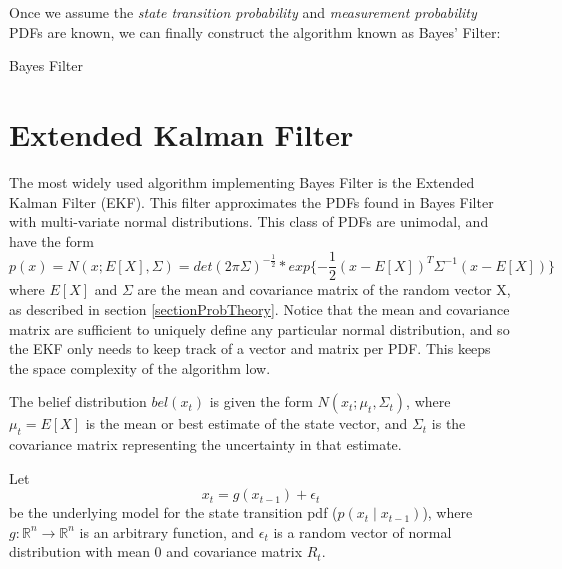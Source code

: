 Once we assume the \textit{state transition probability} and \textit{measurement probability} PDFs are known, we can finally construct the algorithm known as Bayes' Filter:

\begin{algorithm} 
\caption{Bayes Filter} 
\label{alg:BayesFilter}
\begin{algorithmic}[1]
	\State {}
	\EndFunction
\end{algorithmic}
\end{algorithm}

\section{Extended Kalman Filter} \label{sectionEKF}

The most widely used algorithm implementing Bayes Filter is the Extended Kalman Filter (EKF). This filter approximates the PDFs found in Bayes Filter with multi-variate normal distributions. This class of PDFs are unimodal, and have the form 
\begin{equation} \label{eqDefNormal}
p(x) = N(x; E[X],\Sigma) = det(2 \pi \Sigma)^{-\frac{1}{2}} * exp \{-\frac{1}{2} (x - E[X])^T \Sigma^{-1} (x - E[X])\}
\end{equation}
where \(E[X]\) and \(\Sigma\) are the mean and covariance matrix of the random vector X, as described in section \ref{sectionProbTheory}. Notice that the mean and covariance matrix are sufficient to uniquely define any particular normal  distribution, and so the EKF only needs to keep track of a vector and matrix per PDF. This keeps the space complexity of the algorithm low.

The belief distribution \(bel(x_t)\) is given the form \(N(x_t; \mu_t,\Sigma_t)\), where \(\mu_t = E[X]\) is the mean or best estimate of the state vector, and \(\Sigma_t\) is the covariance matrix representing the uncertainty in that estimate.

Let \[x_t =  g(x_{t-1}) + \epsilon_t\] be the underlying model for the state transition pdf (\(p(x_t \mathbin{\vert} x_{t-1})\)), where \(g: \mathbb{R}^n \to \mathbb{R}^n\) is an arbitrary function, and \(\epsilon_t\) is a random vector of normal distribution with mean 0 and covariance matrix \(R_t\).

